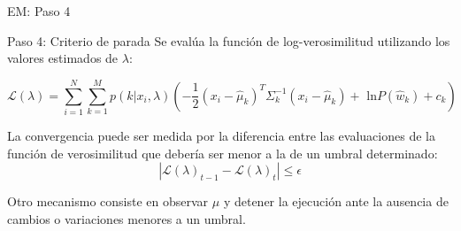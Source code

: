 \documentclass[xcolor=x11names,compress]{beamer}
\renewcommand{\(}{\begin{columns}}
\renewcommand{\)}{\end{columns}}
\newcommand{\<}[1]{\begin{column}{#1}}
\renewcommand{\>}{\end{column}}
\begin{document}
\begin{frame}{EM: Paso 4}
\begin{exampleblock}{Paso 4: Criterio de parada}
Se evalúa la función de log-verosimilitud utilizando los valores estimados de $\lambda$:

\begin{equation}
	\mathcal{L}(\lambda) = \sum_{i=1}^N \sum_{k=1}^{M} p \left ( k|x_i,\lambda \right ) \left( -\frac{1}{2}(x_i - \hat{\mu}_k)^T \Sigma_k^{-1} (x_i - \hat{\mu}_k) + \text{ ln} P(\hat{w}_k) + c_k \right )
\end{equation}

La convergencia puede ser medida por la diferencia entre las evaluaciones de la función de verosimilitud que debería ser menor a la de un umbral determinado:
\begin{equation}
	|\mathcal{L}(\lambda)_{t-1} - \mathcal{L}(\lambda)_{t}|\leq \epsilon
\end{equation}

Otro mecanismo consiste en observar $\mu$ y detener la ejecución ante la ausencia de cambios o variaciones menores a un umbral.
\end{exampleblock}
\end{frame}
\end{document}
